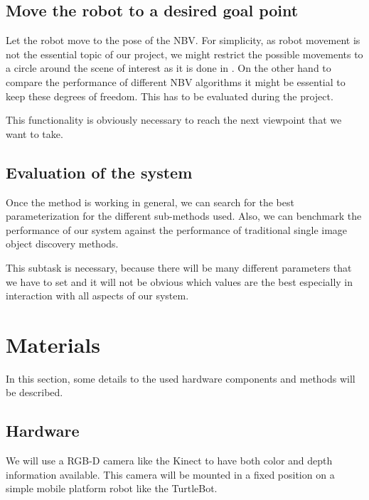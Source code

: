 \documentclass[a4paper,11pt,english]{article}
\begin{document}
\subsection{Move the robot to a desired goal point}
Let the robot move to the pose of the NBV.
For simplicity, as robot movement is not the essential topic of our project, we might restrict the possible movements to a circle around the scene of interest as it is done in \cite{atanasov2014nonmyopic}. On the other hand to compare the performance of different NBV algorithms it might be essential to keep these degrees of freedom. This has to be evaluated during the project.

This functionality is obviously necessary to reach the next viewpoint that we want to take.

\subsection{Evaluation of the system}
Once the method is working in general, we can search for the best parameterization for the different sub-methods used.
Also, we can benchmark the performance of our system against the performance of traditional single image object discovery methods.

This subtask is necessary, because there will be many different parameters that we have to set and it will not be obvious which values are the best especially in interaction with all aspects of our system.

\section{Materials}
In this section, some details to the used hardware components and methods will be described.
\subsection{Hardware}
We will use a RGB-D camera like the Kinect to have both color and depth information available.
This camera will be mounted in a fixed position on a simple mobile platform robot like the TurtleBot.
\end{document}
